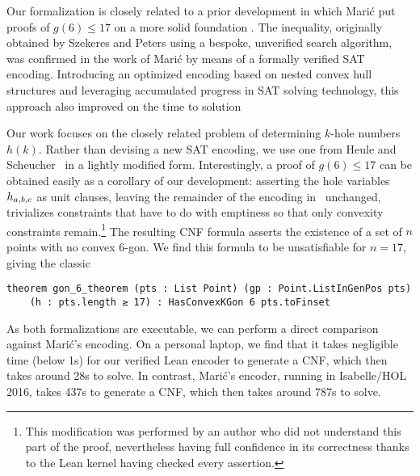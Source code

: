 Our formalization is closely related to a prior development
in which Marić put proofs of $g(6) \leq 17$ on a more solid foundation \cite{19maric_fast_formal_proof_erdos_szekeres_conjecture_convex_polygons_most_six_points}.
The inequality,
originally obtained by Szekeres and Peters \cite{06szekeres_computer_solution_17_point_erdos_szekeres_problem}
using a bespoke, unverified search algorithm,
was confirmed in the work of Marić
by means of a formally verified SAT encoding.
Introducing an optimized encoding based on nested convex hull structures
and leveraging accumulated progress in SAT solving technology, %
this approach also improved on the time to solution

Our work focuses on the closely related problem
of determining $k$-hole numbers $h(k)$.
Rather than devising a new SAT encoding,
we use one from Heule and Scheucher~\cite{emptyHexagonNumber}
in a lightly modified form.
Interestingly,
a proof of $g(6) \leq 17$ can be obtained easily
as a corollary of our development:
asserting the hole variables $\hvar_{a,b,c}$ as unit clauses,
leaving the remainder of the encoding in~ unchanged,
trivializes constraints that have to do with emptiness
so that only convexity constraints remain.\footnote{
This modification was performed by an author
who did not understand this part of the proof,
nevertheless having full confidence in its correctness
thanks to the Lean kernel having checked every assertion.}
The resulting CNF formula
asserts the existence of a set of $n$ points
with no convex $6$-gon.
We find this formula to be unsatisfiable for $n = 17$,
giving the classic
\begin{lstlisting}
theorem gon_6_theorem (pts : List Point) (gp : Point.ListInGenPos pts)
    (h : pts.length ≥ 17) : HasConvexKGon 6 pts.toFinset
\end{lstlisting}

As both formalizations are executable,
we can perform a direct comparison against Marić's encoding.
On a personal laptop,
we find that it takes negligible time (below 1s)
for our verified Lean encoder to generate a CNF,
which then takes around 28s to solve.
In contrast,
Marić's encoder, running in Isabelle/HOL 2016,
takes 437s to generate a CNF,
which then takes around 787s to solve.

